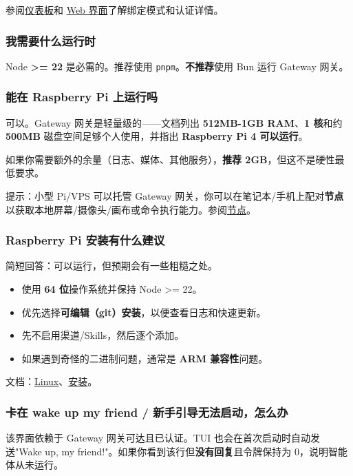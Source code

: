 参阅\href{/web/dashboard}{仪表板}和 \href{/web}{Web 界面}了解绑定模式和认证详情。

\subsubsection{我需要什么运行时}


Node \textbf{>= 22} 是必需的。推荐使用 \texttt{pnpm}。\textbf{不推荐}使用 Bun 运行 Gateway 网关。

\subsubsection{能在 Raspberry Pi 上运行吗}


可以。Gateway 网关是轻量级的——文档列出 \textbf{512MB-1GB RAM}、\textbf{1 核}和约 \textbf{500MB} 磁盘空间足够个人使用，并指出 \textbf{Raspberry Pi 4 可以运行}。

如果你需要额外的余量（日志、媒体、其他服务），\textbf{推荐 2GB}，但这不是硬性最低要求。

提示：小型 Pi/VPS 可以托管 Gateway 网关，你可以在笔记本/手机上配对\textbf{节点}以获取本地屏幕/摄像头/画布或命令执行能力。参阅\href{/nodes}{节点}。

\subsubsection{Raspberry Pi 安装有什么建议}


简短回答：可以运行，但预期会有一些粗糙之处。

\begin{itemize}
  \item 使用 \textbf{64 位}操作系统并保持 Node >= 22。
  \item 优先选择\textbf{可编辑（git）安装}，以便查看日志和快速更新。
  \item 先不启用渠道/Skills，然后逐个添加。
  \item 如果遇到奇怪的二进制问题，通常是 \textbf{ARM 兼容性}问题。
\end{itemize}


文档：\href{/platforms/linux}{Linux}、\href{/install}{安装}。

\subsubsection{卡在 wake up my friend / 新手引导无法启动，怎么办}


该界面依赖于 Gateway 网关可达且已认证。TUI 也会在首次启动时自动发送"Wake up, my friend!"。如果你看到该行但\textbf{没有回复}且令牌保持为 0，说明智能体从未运行。

